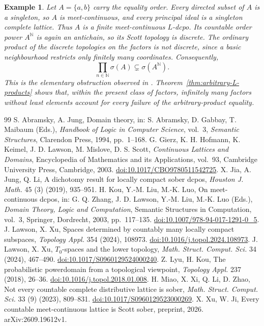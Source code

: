 \documentclass[10pt,a4paper]{amsart}
\newtheorem{example}[theorem]{Example}
\numberwithin{equation}{section}
\newcommand{\N}{\mathbb N}
\newcommand{\Sc}{\sigma}
\begin{document}
\begin{example}\label{ex:antichain-infinite-product}
Let $A=\{a,b\}$ carry the equality order. Every directed subset of $A$ is a singleton, so $A$ is meet-continuous, and every principal ideal is a singleton complete lattice. Thus $A$ is a finite meet-continuous $L$-dcpo. Its countable order power $A^{\N}$ is again an antichain, so its Scott topology is discrete. The ordinary product of the discrete topologies on the factors is not discrete, since a basic neighbourhood restricts only finitely many coordinates. Consequently,
\[
 \prod_{n\in\N}\Sc(A)\subsetneq\Sc(A^{\N}).
\]
This is the elementary obstruction observed in \cite[Section~5]{XuJi}. Theorem~\ref{thm:arbitrary-L-products} shows that, within the present class of factors, infinitely many factors without least elements account for every failure of the arbitrary-product equality.
\end{example}


\begin{thebibliography}{99}
 S. Abramsky, A. Jung, Domain theory, in: S. Abramsky, D. Gabbay, T. Maibaum (Eds.), \emph{Handbook of Logic in Computer Science}, vol.~3, \emph{Semantic Structures}, Clarendon Press, 1994, pp.~1--168.
 G. Gierz, K. H. Hofmann, K. Keimel, J. D. Lawson, M. Mislove, D. S. Scott, \emph{Continuous Lattices and Domains}, Encyclopedia of Mathematics and its Applications, vol.~93, Cambridge University Press, Cambridge, 2003. \href{https://doi.org/10.1017/CBO9780511542725}{doi:10.1017/CBO9780511542725}.
 X. Jia, A. Jung, Q. Li, A dichotomy result for locally compact sober dcpos, \emph{Houston J. Math.} 45 (3) (2019), 935--951.
 H. Kou, Y.-M. Liu, M.-K. Luo, On meet-continuous dcpos, in: G. Q. Zhang, J. D. Lawson, Y.-M. Liu, M.-K. Luo (Eds.), \emph{Domain Theory, Logic and Computation}, Semantic Structures in Computation, vol.~3, Springer, Dordrecht, 2003, pp.~117--135. \href{https://doi.org/10.1007/978-94-017-1291-0_5}{doi:10.1007/978-94-017-1291-0\_5}.
 J. Lawson, X. Xu, Spaces determined by countably many locally compact subspaces, \emph{Topology Appl.} 354 (2024), 108973. \href{https://doi.org/10.1016/j.topol.2024.108973}{doi:10.1016/j.topol.2024.108973}.
 J. Lawson, X. Xu, $T_0$-spaces and the lower topology, \emph{Math. Struct. Comput. Sci.} 34 (2024), 467--490. \href{https://doi.org/10.1017/S0960129524000240}{doi:10.1017/S0960129524000240}.
 Z. Lyu, H. Kou, The probabilistic powerdomain from a topological viewpoint, \emph{Topology Appl.} 237 (2018), 26--36. \href{https://doi.org/10.1016/j.topol.2018.01.008}{doi:10.1016/j.topol.2018.01.008}.
 H. Miao, X. Xi, Q. Li, D. Zhao, Not every countable complete distributive lattice is sober, \emph{Math. Struct. Comput. Sci.} 33 (9) (2023), 809--831. \href{https://doi.org/10.1017/S0960129523000269}{doi:10.1017/S0960129523000269}.
 X. Xu, W. Ji, Every countable meet-continuous lattice is Scott sober, preprint, 2026. arXiv:2609.19612v1.
\end{thebibliography}
\end{document}

